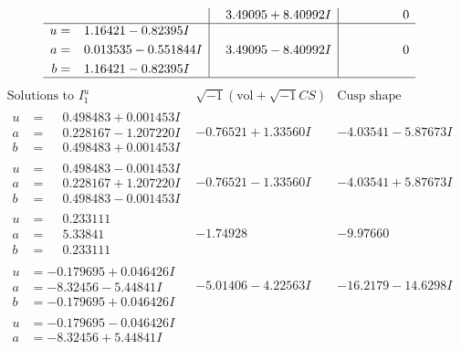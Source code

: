 \documentclass[1p]{elsarticle_modified}
\theoremstyle{definition}
\newcommand{\I}{\sqrt{-1}}
\begin{document}
$$\begin{array}{c|c|c}
 & \phantom{-}3.49095 + 8.40992 I & \phantom{-0.000000 } 0 \\ \hline\begin{aligned}
u &= \phantom{-}1.16421 - 0.82395 I \\
a &= \phantom{-}0.013535 - 0.551844 I \\
b &= \phantom{-}1.16421 - 0.82395 I\end{aligned}
 & \phantom{-}3.49095 - 8.40992 I & \phantom{-0.000000 } 0\\
 \hline 
 \end{array}$$\newpage$$\begin{array}{c|c|c}  
\text{Solutions to }I^u_{1}& \I (\text{vol} + \sqrt{-1}CS) & \text{Cusp shape}\\
 \hline 
\begin{aligned}
u &= \phantom{-}0.498483 + 0.001453 I \\
a &= \phantom{-}0.228167 - 1.207220 I \\
b &= \phantom{-}0.498483 + 0.001453 I\end{aligned}
 & -0.76521 + 1.33560 I & -4.03541 - 5.87673 I \\ \hline\begin{aligned}
u &= \phantom{-}0.498483 - 0.001453 I \\
a &= \phantom{-}0.228167 + 1.207220 I \\
b &= \phantom{-}0.498483 - 0.001453 I\end{aligned}
 & -0.76521 - 1.33560 I & -4.03541 + 5.87673 I \\ \hline\begin{aligned}
u &= \phantom{-}0.233111\phantom{ +0.000000I} \\
a &= \phantom{-}5.33841\phantom{ +0.000000I} \\
b &= \phantom{-}0.233111\phantom{ +0.000000I}\end{aligned}
 & -1.74928\phantom{ +0.000000I} & -9.97660\phantom{ +0.000000I} \\ \hline\begin{aligned}
u &= -0.179695 + 0.046426 I \\
a &= -8.32456 - 5.44841 I \\
b &= -0.179695 + 0.046426 I\end{aligned}
 & -5.01406 - 4.22563 I & -16.2179 - 14.6298 I \\ \hline\begin{aligned}
u &= -0.179695 - 0.046426 I \\
a &= -8.32456 + 5.44841 I \\

\end{aligned}
\end{array}$$
\end{document}
